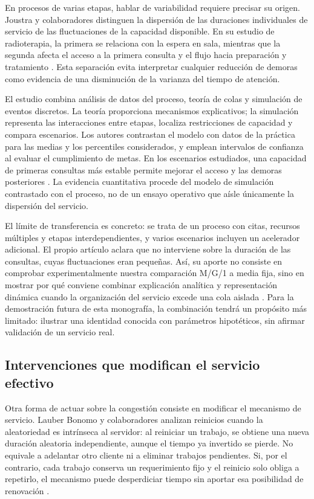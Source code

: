 En procesos de varias etapas, hablar de variabilidad requiere precisar su origen. Joustra y colaboradores distinguen la dispersión de las duraciones individuales de servicio de las fluctuaciones de la capacidad disponible. En su estudio de radioterapia, la primera se relaciona con la espera en sala, mientras que la segunda afecta el acceso a la primera consulta y el flujo hacia preparación y tratamiento \cite{joustra2012radioterapia}. Esta separación evita interpretar cualquier reducción de demoras como evidencia de una disminución de la varianza del tiempo de atención.

El estudio combina análisis de datos del proceso, teoría de colas y simulación de eventos discretos. La teoría proporciona mecanismos explicativos; la simulación representa las interacciones entre etapas, localiza restricciones de capacidad y compara escenarios. Los autores contrastan el modelo con datos de la práctica para las medias y los percentiles considerados, y emplean intervalos de confianza al evaluar el cumplimiento de metas. En los escenarios estudiados, una capacidad de primeras consultas más estable permite mejorar el acceso y las demoras posteriores \cite{joustra2012radioterapia}. La evidencia cuantitativa procede del modelo de simulación contrastado con el proceso, no de un ensayo operativo que aísle únicamente la dispersión del servicio.

El límite de transferencia es concreto: se trata de un proceso con citas, recursos múltiples y etapas interdependientes, y varios escenarios incluyen un acelerador adicional. El propio artículo aclara que no interviene sobre la duración de las consultas, cuyas fluctuaciones eran pequeñas. Así, su aporte no consiste en comprobar experimentalmente nuestra comparación M/G/1 a media fija, sino en mostrar por qué conviene combinar explicación analítica y representación dinámica cuando la organización del servicio excede una cola aislada \cite{joustra2012radioterapia}. Para la demostración futura de esta monografía, la combinación tendrá un propósito más limitado: ilustrar una identidad conocida con parámetros hipotéticos, sin afirmar validación de un servicio real.

\subsection{Intervenciones que modifican el servicio efectivo}
\label{subsec:literatura-reinicios}

Otra forma de actuar sobre la congestión consiste en modificar el mecanismo de servicio. Lauber Bonomo y colaboradores analizan reinicios cuando la aleatoriedad es intrínseca al servidor: al reiniciar un trabajo, se obtiene una nueva duración aleatoria independiente, aunque el tiempo ya invertido se pierde. No equivale a adelantar otro cliente ni a eliminar trabajos pendientes. Si, por el contrario, cada trabajo conserva un requerimiento fijo y el reinicio solo obliga a repetirlo, el mecanismo puede desperdiciar tiempo sin aportar esa posibilidad de renovación \cite{lauberbonomo2021resetting}.

